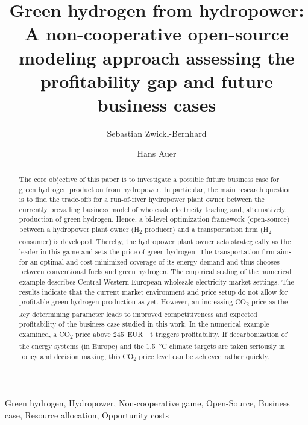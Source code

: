 \documentclass[review]{elsarticle}
\begin{document}
\begin{frontmatter}

\title{Green hydrogen from hydropower: A non-cooperative open-source modeling approach assessing the profitability gap and future business cases}
\author[1]{Sebastian Zwickl-Bernhard}
\author[1]{Hans Auer}
\address[1]{Energy Economics Group (EEG), Technische Universität Wien, Gusshausstrasse 25-29/E370-3, 1040 Wien, Austria}


\begin{abstract}
The core objective of this paper is to investigate a possible future business case for green hydrogen production from hydropower. In particular, the main research question is to find the trade-offs for a run-of-river hydropower plant owner between the currently prevailing business model of wholesale electricity trading and, alternatively, production of green hydrogen. Hence, a bi-level optimization framework (open-source) between a hydropower plant owner (H\textsubscript{2} producer) and a transportation firm (H\textsubscript{2} consumer) is developed. Thereby, the hydropower plant owner acts strategically as the leader in this game and sets the price of green hydrogen. The transportation firm aims for an optimal and cost-minimized coverage of its energy demand and thus chooses between conventional fuels and green hydrogen. The empirical scaling of the numerical example describes Central Western European wholesale electricity market settings. The results indicate that the current market environment and price setup do not allow for profitable green hydrogen production as yet. However, an increasing CO\textsubscript{2} price as the key determining parameter leads to improved competitiveness and expected profitability of the business case studied in this work. In the numerical example examined, a CO\textsubscript{2} price above \SI{245}{EUR \per \tonne} triggers profitability. If decarbonization of the energy systems (in Europe) and the \SI{1.5}{\degreeCelsius} climate targets are taken seriously in policy and decision making, this CO\textsubscript{2} price level can be achieved rather quickly.
\end{abstract}


\begin{keyword}
Green hydrogen, Hydropower, Non-cooperative game, Open-Source, Business case, Resource allocation, Opportunity costs
\end{keyword}

\end{frontmatter}
\end{document}
